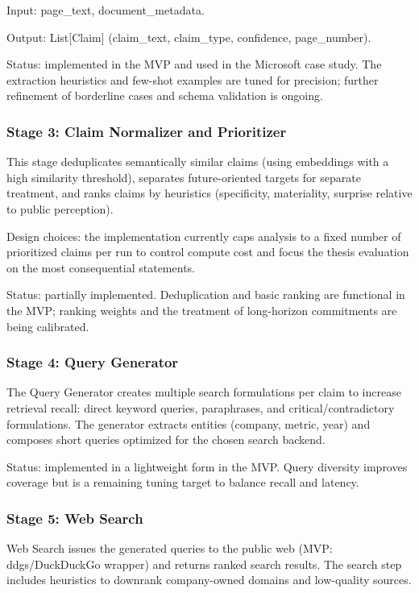 Input: page_text, document_metadata.

Output: List[Claim] (claim_text, claim_type, confidence, page_number).

Status: implemented in the MVP and used in the Microsoft case study. The extraction heuristics and few-shot examples are tuned for precision; further refinement of borderline cases and schema validation is ongoing.

\subsubsection{Stage 3: Claim Normalizer and Prioritizer}

This stage deduplicates semantically similar claims (using embeddings with a high similarity threshold), separates future-oriented targets for separate treatment, and ranks claims by heuristics (specificity, materiality, surprise relative to public perception).

Design choices: the implementation currently caps analysis to a fixed number of prioritized claims per run to control compute cost and focus the thesis evaluation on the most consequential statements.

Status: partially implemented. Deduplication and basic ranking are functional in the MVP; ranking weights and the treatment of long-horizon commitments are being calibrated.

\subsubsection{Stage 4: Query Generator}

The Query Generator creates multiple search formulations per claim to increase retrieval recall: direct keyword queries, paraphrases, and critical/contradictory formulations. The generator extracts entities (company, metric, year) and composes short queries optimized for the chosen search backend.

Status: implemented in a lightweight form in the MVP. Query diversity improves coverage but is a remaining tuning target to balance recall and latency.

\subsubsection{Stage 5: Web Search}

Web Search issues the generated queries to the public web (MVP: ddgs/DuckDuckGo wrapper) and returns ranked search results. The search step includes heuristics to downrank company-owned domains and low-quality sources.

